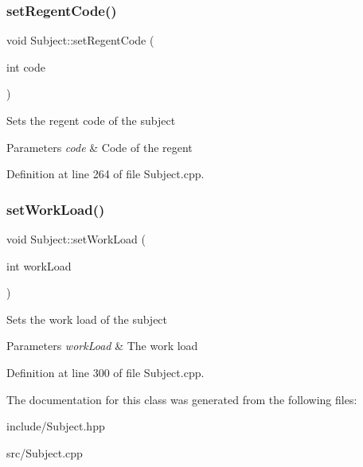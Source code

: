 \mbox{\label{classSubject_a6d2cf53e66fdb1ac6658c03d5be73b3e}} 
\subsubsection{\texorpdfstring{set\+Regent\+Code()}{setRegentCode()}}
{\footnotesize\ttfamily void Subject\+::set\+Regent\+Code (\begin{DoxyParamCaption}\item[{int}]{code }\end{DoxyParamCaption})}

Sets the regent code of the subject 
\begin{DoxyParams}{Parameters}
{\em code} & Code of the regent \\
\hline
\end{DoxyParams}


Definition at line 264 of file Subject.\+cpp.

\mbox{\label{classSubject_aafa4294e098c5c1257a8b5ba75ff1cb6}} 
\subsubsection{\texorpdfstring{set\+Work\+Load()}{setWorkLoad()}}
{\footnotesize\ttfamily void Subject\+::set\+Work\+Load (\begin{DoxyParamCaption}\item[{int}]{work\+Load }\end{DoxyParamCaption})}

Sets the work load of the subject 
\begin{DoxyParams}{Parameters}
{\em work\+Load} & The work load \\
\hline
\end{DoxyParams}


Definition at line 300 of file Subject.\+cpp.



The documentation for this class was generated from the following files\+:\begin{DoxyCompactItemize}
\item 
include/Subject.\+hpp\item 
src/Subject.\+cpp\end{DoxyCompactItemize}
